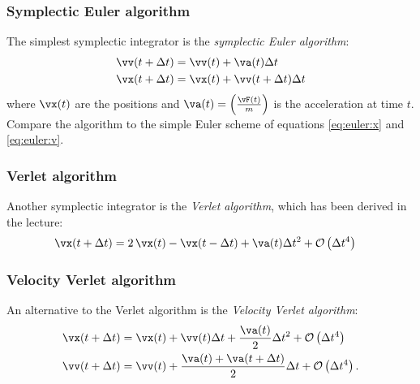 \subsubsection{Symplectic Euler algorithm}

The simplest symplectic integrator is the \emph{symplectic Euler
  algorithm}:
\begin{align}
  \label{eq:euler}
  \vv(t + \Delta t) &= \vv(t)  + \va(t) \Delta t\\
  \vx(t + \Delta t) &= \vx(t) + \vv(t + \Delta t) \Delta t
\end{align}
where $\vx(t)$ are the positions and $\va(t) = \left( \frac{\vF(t)}{m}
\right)$ is the acceleration at time $t$.  Compare the algorithm to
the simple Euler scheme of equations \eqref{eq:euler:x} and
\eqref{eq:euler:v}.

\subsubsection{Verlet algorithm}

Another symplectic integrator is the \emph{Verlet algorithm}, which has
been derived in the lecture:
\begin{align}
\label{eq:verlet}
\vx(t+\Delta t)&=2\,\vx(t)-\vx(t-\Delta t)+\va(t) \Delta
t^2+\mathcal{O}\left(\Delta t^4\right)
\end{align}

\subsubsection{Velocity Verlet algorithm}

An alternative to the Verlet algorithm is the \emph{Velocity Verlet
algorithm}:
\begin{align}
\label{eq:vv:x}
\vx(t+\Delta t) & = \vx(t)+\vv(t) \Delta t+\frac{\va(t)}{2}\Delta t^2+\mathcal{O}\left(\Delta t^4\right)\\
\label{eq:vv:v}
\vv(t+\Delta t) & = \vv(t)+\frac{\va(t)+\va(t+\Delta t)}{2}\Delta t+\mathcal{O}\left(\Delta t^4\right).
\end{align}

